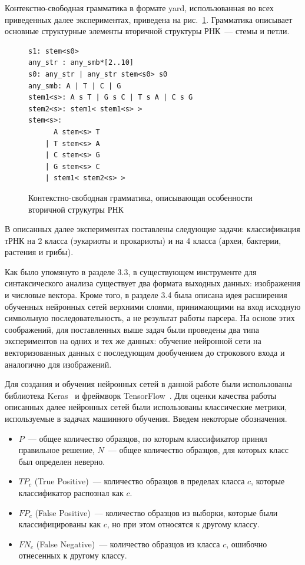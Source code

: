 Контекстно-свободная грамматика в формате yard, использованная во всех приведенных далее экспериментах, приведена на рис.~\ref{rna}. Грамматика описывает основные структурные элементы вторичной структуры РНК~--- стемы и петли.

\begin{figure} [h]
\begin{verbatim}
s1: stem<s0>
any_str : any_smb*[2..10]
s0: any_str | any_str stem<s0> s0
any_smb: A | T | C | G
stem1<s>: A s T | G s C | T s A | C s G
stem2<s>: stem1< stem1<s> >
stem<s>:
      A stem<s> T
    | T stem<s> A
    | C stem<s> G
    | G stem<s> C
    | stem1< stem2<s> >
\end{verbatim}
\caption{Контекстно-свободная грамматика, описывающая особенности вторичной струкутры РНК}
\label{rna}
\end{figure}

В описанных далее экспериментах поставлены следующие задачи: классификация тРНК на 2 класса (эукариоты и прокариоты) и на 4 класса (археи, бактерии, растения и грибы).

Как было упомянуто в разделе 3.3, в существующем инструменте для синтаксического анализа существует два формата выходных данных: изображения и числовые вектора. Кроме того, в разделе 3.4 была описана идея расширения обученных нейронных сетей верхними слоями, принимающими на вход исходную символьную последовательность, а не результат работы парсера. На основе этих соображений, для поставленных выше задач были проведены два типа экспериментов на одних и тех же данных: обучение нейронной сети на векторизованных данных с последующим дообучением до строкового входа и аналогично для изображений.


Для создания и обучения нейронных сетей в данной работе были использованы библиотека Keras~\cite{keras} и фреймворк TensorFlow~\cite{tensorflow}.
Для оценки качества работы описанных далее нейронных сетей были использованы классические метрики, используемые в задачах машинного обучения. Введем некоторые обозначения.
\begin{itemize}
    \item $P$~--- общее количество образцов, по которым классификатор принял правильное решение, $N$~--- общее количество образцов, для которых класс был определен неверно.
    \item $TP_{c}$ (True Positive)~--- количество образцов в пределах класса $c$, которые классификатор распознал как $c$.
    \item $FP_{c}$ (False Positive)~--- количество образцов из выборки, которые были классифицированы как $c$, но при этом относятся к другому классу.
    \item $FN_{c}$ (False Negative)~--- количество образцов из класса $c$, ошибочно отнесенных к другому классу.
\end{itemize}

